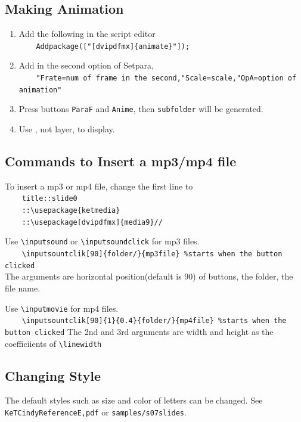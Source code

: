 \documentclass[papersize,a4paper,12pt]{article}
\begin{document}
\subsection{Making Animation}

\begin{enumerate}[1)]
\item Add the following in the script editor\\ 
\verb|    Addpackage(["[dvipdfmx]{animate}"]);|
\item Add in the second option of Setpara,\\
\verb|    "Frate=num of frame in the second,"Scale=scale,"OpA=option of animation" |
\item Press buttons \verb|ParaF| and \verb|Anime|, then \verb|subfolder| will be generated.
\item Use \verb||, not layer, to display.
\end{enumerate}

\subsection{Commands to Insert a mp3/mp4 file}

To insert a mp3 or mp4 file, change the first line to\\
\verb|    title::slide0|\\
\verb|    ::\usepackage{ketmedia}|\\
\verb|    ::\usepackage[dvipdfmx]{media9}//|\vspace{2mm}

\noindent
Use \verb|\inputsound| or \verb|\inputsoundclick| for mp3 files.\\
\verb|    \inputsountclik[90]{folder/}{mp3file} %starts when the button clicked|\\
The arguments are horizontal position(default is 90) of buttons, the folder, the file name.
\vspace{2mm}

\noindent
Use \verb|\inputmovie| for mp4 files.\\
\verb|    \inputsountclik[90]{1}{0.4}{folder/}{mp4file} %starts when the button clicked|
The 2nd and 3rd arguments are width and height as the coefficiients of \verb|\linewidth|

\subsection{Changing Style}

The default styles such as size and color of letters can be changed.
See \verb|KeTCindyReferenceE,pdf| or \verb|samples/s07slides|.
\end{document}
